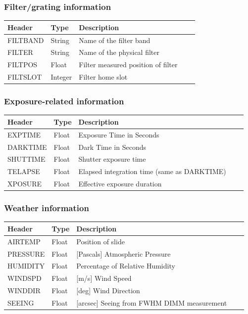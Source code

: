 \subsubsection{Filter/grating information}
\begin{tabular}{l l l l l}

\hline
Header & Type & Description \\
\hline
FILTBAND & String & Name of the filter band \\
FILTER & String & Name of the physical filter \\
FILTPOS & Float & Filter measured position of filter \\
FILTSLOT & Integer & Filter home slot \\
\hline
\end{tabular}


\subsubsection{Exposure-related information}
\begin{tabular}{l l l l l}

\hline
Header & Type & Description \\
\hline
EXPTIME & Float & Exposure Time in Seconds \\
DARKTIME & Float & Dark Time in Seconds \\
SHUTTIME & Float & Shutter exposure time \\
TELAPSE & Float & Elapsed integration time (same as DARKTIME) \\
XPOSURE & Float & Effective exposure duration \\
\hline
\end{tabular}


\subsubsection{Weather information}
\begin{tabular}{l l l l l}

\hline
Header & Type & Description \\
\hline
AIRTEMP & Float & Position of slide \\
PRESSURE & Float & [Pascals] Atmospheric Pressure \\
HUMIDITY & Float & Percentage of Relative Humidity \\
WINDSPD & Float & [m/s] Wind Speed \\
WINDDIR & Float & [deg] Wind Direction \\
SEEING & Float & [arcsec] Seeing from FWHM DIMM measurement \\
\hline
\end{tabular}


